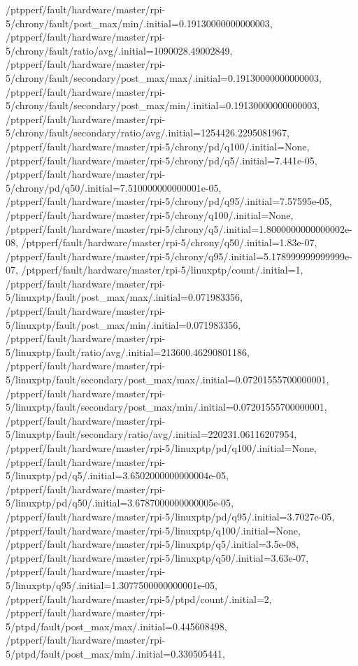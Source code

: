 {    /ptpperf/fault/hardware/master/rpi-5/chrony/fault/post_max/min/.initial=0.19130000000000003,
    /ptpperf/fault/hardware/master/rpi-5/chrony/fault/ratio/avg/.initial=1090028.49002849,
    /ptpperf/fault/hardware/master/rpi-5/chrony/fault/secondary/post_max/max/.initial=0.19130000000000003,
    /ptpperf/fault/hardware/master/rpi-5/chrony/fault/secondary/post_max/min/.initial=0.19130000000000003,
    /ptpperf/fault/hardware/master/rpi-5/chrony/fault/secondary/ratio/avg/.initial=1254426.2295081967,
    /ptpperf/fault/hardware/master/rpi-5/chrony/pd/q100/.initial=None,
    /ptpperf/fault/hardware/master/rpi-5/chrony/pd/q5/.initial=7.441e-05,
    /ptpperf/fault/hardware/master/rpi-5/chrony/pd/q50/.initial=7.510000000000001e-05,
    /ptpperf/fault/hardware/master/rpi-5/chrony/pd/q95/.initial=7.57595e-05,
    /ptpperf/fault/hardware/master/rpi-5/chrony/q100/.initial=None,
    /ptpperf/fault/hardware/master/rpi-5/chrony/q5/.initial=1.8000000000000002e-08,
    /ptpperf/fault/hardware/master/rpi-5/chrony/q50/.initial=1.83e-07,
    /ptpperf/fault/hardware/master/rpi-5/chrony/q95/.initial=5.178999999999999e-07,
    /ptpperf/fault/hardware/master/rpi-5/linuxptp/count/.initial=1,
    /ptpperf/fault/hardware/master/rpi-5/linuxptp/fault/post_max/max/.initial=0.071983356,
    /ptpperf/fault/hardware/master/rpi-5/linuxptp/fault/post_max/min/.initial=0.071983356,
    /ptpperf/fault/hardware/master/rpi-5/linuxptp/fault/ratio/avg/.initial=213600.46290801186,
    /ptpperf/fault/hardware/master/rpi-5/linuxptp/fault/secondary/post_max/max/.initial=0.07201555700000001,
    /ptpperf/fault/hardware/master/rpi-5/linuxptp/fault/secondary/post_max/min/.initial=0.07201555700000001,
    /ptpperf/fault/hardware/master/rpi-5/linuxptp/fault/secondary/ratio/avg/.initial=220231.06116207954,
    /ptpperf/fault/hardware/master/rpi-5/linuxptp/pd/q100/.initial=None,
    /ptpperf/fault/hardware/master/rpi-5/linuxptp/pd/q5/.initial=3.6502000000000004e-05,
    /ptpperf/fault/hardware/master/rpi-5/linuxptp/pd/q50/.initial=3.6787000000000005e-05,
    /ptpperf/fault/hardware/master/rpi-5/linuxptp/pd/q95/.initial=3.7027e-05,
    /ptpperf/fault/hardware/master/rpi-5/linuxptp/q100/.initial=None,
    /ptpperf/fault/hardware/master/rpi-5/linuxptp/q5/.initial=3.5e-08,
    /ptpperf/fault/hardware/master/rpi-5/linuxptp/q50/.initial=3.63e-07,
    /ptpperf/fault/hardware/master/rpi-5/linuxptp/q95/.initial=1.3077500000000001e-05,
    /ptpperf/fault/hardware/master/rpi-5/ptpd/count/.initial=2,
    /ptpperf/fault/hardware/master/rpi-5/ptpd/fault/post_max/max/.initial=0.445608498,
    /ptpperf/fault/hardware/master/rpi-5/ptpd/fault/post_max/min/.initial=0.330505441,
}

